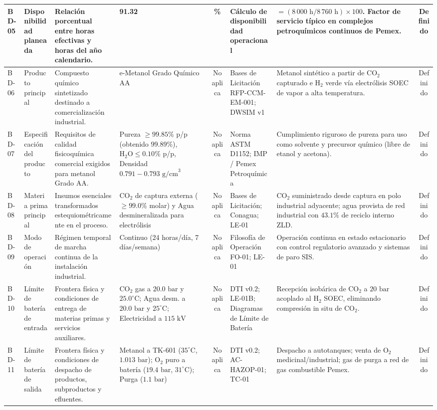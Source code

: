 \documentclass[10pt,letterpaper]{article}
\begin{document}
\begin{landscape}
\begin{xltabular}{\linewidth}{|l|p{2.8cm}|p{3.5cm}|p{3.0cm}|c|p{3.2cm}|>{\raggedright\arraybackslash}X|c|}
BD-05 & Disponibilidad planeada & Relación porcentual entre horas efectivas y horas del año calendario. & 91.32 & \% & Cálculo de disponibilidad operacional & $= (8\,000\text{ h} / 8\,760\text{ h}) \times 100$. Factor de servicio típico en complejos petroquímicos continuos de Pemex. & Definido \\ \hline
BD-06 & Producto principal & Compuesto químico sintetizado destinado a comercialización industrial. & e-Metanol Grado Químico AA & No aplica & Bases de Licitación RFP-CCM-EM-001; DWSIM v1 & Metanol sintético a partir de $\text{CO}_2$ capturado e $\text{H}_2$ verde vía electrólisis SOEC de vapor a alta temperatura. & Definido \\ \hline
BD-07 & Especificación del producto & Requisitos de calidad fisicoquímica comercial exigidos para metanol Grado AA. & Pureza $\ge 99.85\%$ p/p (obtenido $99.89\%$), $\text{H}_2\text{O} \le 0.10\%$ p/p, Densidad $0.791-0.793\text{ g/cm}^3$ & No aplica & Norma ASTM D1152; IMP / Pemex Petroquímica & Cumplimiento riguroso de pureza para uso como solvente y precursor químico (libre de etanol y acetona). & Definido \\ \hline
BD-08 & Materia prima principal & Insumos esenciales transformados estequiométricamente en el proceso. & $\text{CO}_2$ de captura externa ($\ge 99.0\%$ molar) y Agua desmineralizada para electrólisis & No aplica & Bases de Licitación; Conagua; LE-01 & $\text{CO}_2$ suministrado desde captura en polo industrial adyacente; agua provista de red industrial con $43.1\%$ de reciclo interno ZLD. & Definido \\ \hline
BD-09 & Modo de operación & Régimen temporal de marcha continua de la instalación industrial. & Continuo (24 horas/día, 7 días/semana) & No aplica & Filosofía de Operación FO-01; LE-01 & Operación continua en estado estacionario con control regulatorio avanzado y sistemas de paro SIS. & Definido \\ \hline
BD-10 & Límite de batería de entrada & Frontera física y condiciones de entrega de materias primas y servicios auxiliares. & $\text{CO}_2$ gas a $20.0\text{ bar}$ y $25.0^\circ\text{C}$; Agua desm. a $20.0\text{ bar}$ y $25^\circ\text{C}$; Electricidad a $115\text{ kV}$ & No aplica & DTI v0.2; LE-01B; Diagramas de Límite de Batería & Recepción isobárica de $\text{CO}_2$ a $20\text{ bar}$ acoplado al $\text{H}_2$ SOEC, eliminando compresión in situ de $\text{CO}_2$. & Definido \\ \hline
BD-11 & Límite de batería de salida & Frontera física y condiciones de despacho de productos, subproductos y efluentes. & Metanol a TK-601 ($35^\circ\text{C}$, $1.013\text{ bar}$); $\text{O}_2$ puro a batería ($19.4\text{ bar}$, $31^\circ\text{C}$); Purga ($1.1\text{ bar}$) & No aplica & DTI v0.2; AC-HAZOP-01; TC-01 & Despacho a autotanques; venta de $\text{O}_2$ medicinal/industrial; gas de purga a red de gas combustible Pemex. & Definido \\ \hline

\end{xltabular}
\end{landscape}
\end{document}
